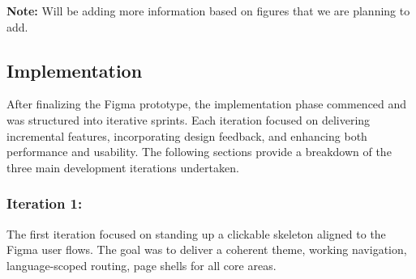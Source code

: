 \textbf{Note:} Will be adding more information based on figures that we are planning to add.

\subsection{Implementation}

After finalizing the Figma prototype, the implementation phase commenced and was structured into iterative sprints. Each iteration focused on delivering incremental features, incorporating design feedback, and enhancing both performance and usability. The following sections provide a breakdown of the three main development iterations undertaken.

\subsubsection{Iteration 1:}
The first iteration focused on standing up a clickable skeleton aligned to the Figma user flows. The goal was to deliver a coherent theme, working navigation, language-scoped routing, page shells for all core areas.


